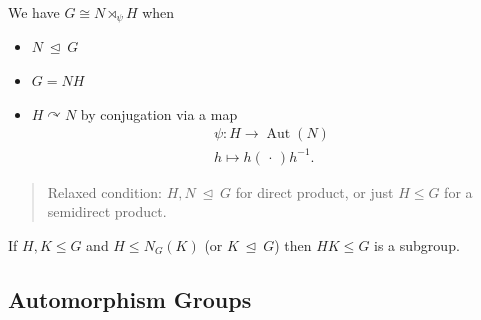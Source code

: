 \begin{theorem}

We have \(G \cong N \rtimes_\psi H\) when

\begin{itemize}
\item
  \(N {~\trianglelefteq~}G\)
\item
  \(G = NH\)
\item
  \(H \curvearrowright N\) by conjugation via a map
  \begin{align*}  
  \psi: H \to {\operatorname{Aut}}(N) \\
  h \mapsto h({\,\cdot\,})h^{-1}
  .\end{align*}
\end{itemize}

\begin{quote}
Relaxed condition: \(H, N {~\trianglelefteq~}G\) for direct product, or
just \(H\leq G\) for a semidirect product.
\end{quote}

\end{theorem}

\begin{proposition}

If \(H,K \leq G\) and \(H \leq N_G(K)\) (or \(K {~\trianglelefteq~}G\))
then \(HK \leq G\) is a subgroup.

\end{proposition}

\hypertarget{automorphism-groups}{%
\subsection{Automorphism Groups}\label{automorphism-groups}}

